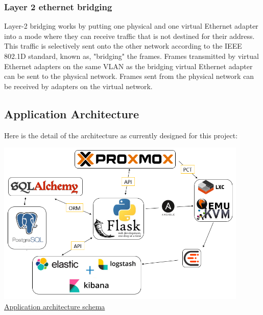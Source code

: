\vspace{1cm}
\subsubsection{Layer 2 ethernet bridging}

Layer-2 bridging works by putting one physical and one virtual Ethernet adapter into a mode where they can receive traffic that is not destined for their address. This traffic is selectively sent onto the other network according to the IEEE 802.1D standard, known as, "bridging" the frames. Frames transmitted by virtual Ethernet adapters on the same VLAN as the bridging virtual Ethernet adapter can be sent to the physical network. Frames sent from the physical network can be received by adapters on the virtual network.

\pagebreak

\subsection{Application Architecture}

Here is the detail of the architecture as currently designed for this project:
\vspace{1cm}
\begin{center}
\includegraphics[width=0.90\textwidth]{images/schema.png}
\\
\underline{Application architecture schema}
\end{center}

